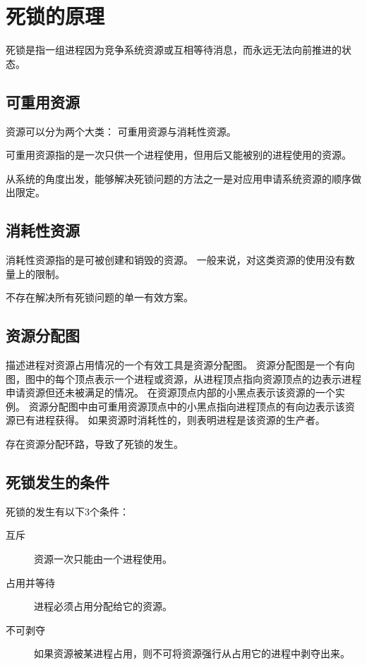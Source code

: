 
\section{死锁的原理}
{
    死锁是指一组进程因为竞争系统资源或互相等待消息，而永远无法向前推进的状态。

    \subsection{可重用资源}
    {
        资源可以分为两个大类：
        可重用资源与消耗性资源。

        可重用资源指的是一次只供一个进程使用，但用后又能被别的进程使用的资源。

        从系统的角度出发，能够解决死锁问题的方法之一是对应用申请系统资源的顺序做出限定。
    }

    \subsection{消耗性资源}
    {
        消耗性资源指的是可被创建和销毁的资源。
        一般来说，对这类资源的使用没有数量上的限制。

        不存在解决所有死锁问题的单一有效方案。
    }

    \subsection{资源分配图}
    {
        描述进程对资源占用情况的一个有效工具是资源分配图。
        资源分配图是一个有向图，图中的每个顶点表示一个进程或资源，从进程顶点指向资源顶点的边表示进程申请资源但还未被满足的情况。
        在资源顶点内部的小黑点表示该资源的一个实例。
        资源分配图中由可重用资源顶点中的小黑点指向进程顶点的有向边表示该资源已有进程获得。
        如果资源时消耗性的，则表明进程是该资源的生产者。

        存在资源分配环路，导致了死锁的发生。
    }

    \subsection{死锁发生的条件}
    {
        死锁的发生有以下3个条件：

        \begin{description}
            \item[互斥] 资源一次只能由一个进程使用。
            \item[占用并等待] 进程必须占用分配给它的资源。
            \item[不可剥夺] 如果资源被某进程占用，则不可将资源强行从占用它的进程中剥夺出来。
        \end{description}

}}
